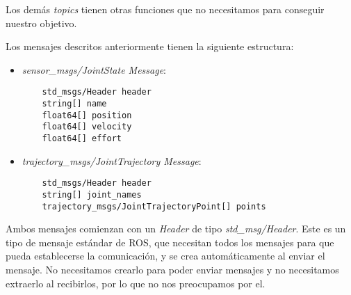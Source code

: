 Los demás \textit{topics} tienen otras funciones que no necesitamos para conseguir nuestro objetivo.

Los mensajes descritos anteriormente tienen la siguiente estructura:
\begin{itemize}
	\item \textit{sensor\_msgs/JointState Message}:
	\begin{lstlisting}
	std_msgs/Header header
	string[] name
	float64[] position
	float64[] velocity
	float64[] effort
	\end{lstlisting}
	\item \textit{trajectory\_msgs/JointTrajectory Message}:
	\begin{lstlisting}
	std_msgs/Header header
	string[] joint_names
	trajectory_msgs/JointTrajectoryPoint[] points
	\end{lstlisting}
\end{itemize}

Ambos mensajes comienzan con un \textit{Header} de tipo \textit{std\_msg/Header}. Este es un tipo de mensaje estándar de ROS, que necesitan todos los mensajes para que pueda establecerse la comunicación, y se crea automáticamente al enviar el mensaje. No necesitamos crearlo para poder enviar mensajes y no necesitamos extraerlo al recibirlos, por lo que no nos preocupamos por el.


